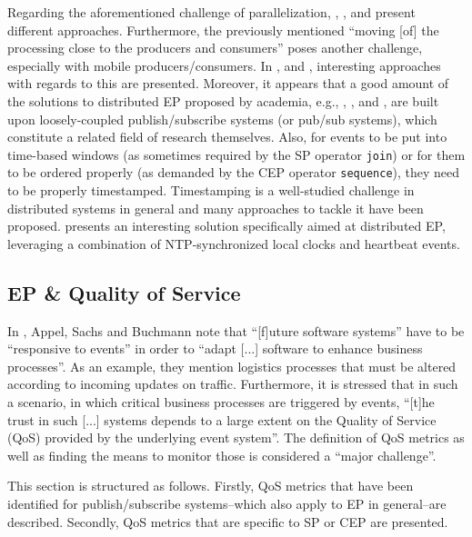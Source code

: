 \documentclass[article, type=bsc, colorback, accentcolor=tud8b, parskip=half, bibliography=totocnumbered]{tudthesis}
\begin{document}
Regarding the aforementioned challenge of parallelization, \cite{stratified}, \cite{Farroukh:2009:PEP:1619258.1619269}, \cite{Khandekar:2009:COS:1656980.1657002} and \cite{Hirzel:2012:PCP:2335484.2335506} present different approaches.
Furthermore, the previously mentioned ``moving [of] the processing close to the producers and consumers'' poses another challenge, especially with mobile producers/consumers.
In \cite{Pietzuch:2003:FEC:1515915.1515921}, \cite{1203579} and \cite{Ottenwalder:2013:MOM:2488222.2488265}, interesting approaches with regards to this are presented.
Moreover, it appears that a good amount of the solutions to distributed EP proposed by academia, e.g., \cite{792159}, \cite{Pietzuch:2003:FEC:1515915.1515921}, \cite{1203579} and \cite{Farroukh:2009:PEP:1619258.1619269}, are built upon loosely-coupled publish/subscribe systems (or pub/sub systems), which constitute a related field of research themselves.
Also, for events to be put into time-based windows (as sometimes required by the SP operator \lstinline{join}) or for them to be ordered properly (as demanded by the CEP operator \lstinline{sequence}), they need to be properly timestamped.
Timestamping is a well-studied challenge in distributed systems in general and many approaches to tackle it have been proposed.
\cite{792159} presents an interesting solution specifically aimed at distributed EP, leveraging a combination of NTP-synchronized local clocks and heartbeat events.

\subsection{EP \& Quality of Service}
\label{sec:ep_qos}

In \cite{quality}, Appel, Sachs and Buchmann note that ``[f]uture software systems'' have to be ``responsive to events'' in order to ``adapt [...] software to enhance business processes''.
As an example, they mention logistics processes that must be altered according to incoming updates on traffic.
Furthermore, it is stressed that in such a scenario, in which critical business processes are triggered by events, ``[t]he trust in such [...] systems depends to a large extent on the Quality of Service (QoS) provided by the underlying event system''.
The definition of QoS metrics as well as finding the means to monitor those is considered a ``major challenge''.

This section is structured as follows.
Firstly, QoS metrics that have been identified for publish/subscribe systems--which also apply to EP in general--are described.
Secondly, QoS metrics that are specific to SP or CEP are presented.
\end{document}
